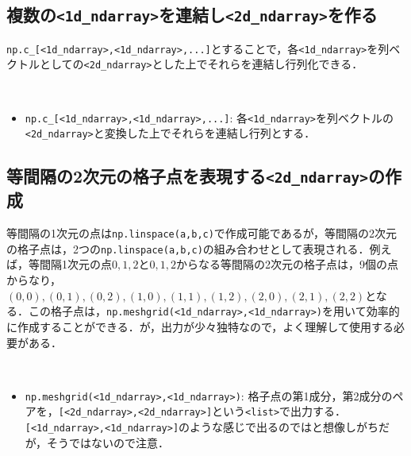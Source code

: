 \subsection{複数の\texttt{<1d\_ndarray>}を連結し\texttt{<2d\_ndarray>}を作る}

\texttt{np.c\_[<1d\_ndarray>,<1d\_ndarray>,...]}とすることで，各\texttt{<1d\_ndarray>}を列ベクトルとしての\texttt{<2d\_ndarray>}とした上でそれらを連結し行列化できる．

\begin{gram}　
\begin{itemize}
\item \texttt{np.c\_[<1d\_ndarray>,<1d\_ndarray>,...]}: 各\texttt{<1d\_ndarray>}を列ベクトルの\texttt{<2d\_ndarray>}と変換した上でそれらを連結し行列とする．
\end{itemize}
\end{gram}

\begin{cod}[\texttt{num9.py}]　
}]{code/num9.py}
\vspace{-10pt}
\begin{lstlisting}
matrix=
[[ 1 -1]
 [ 2 -2]
 [ 3 -3]
 [ 4 -4]],
shape=(4, 2)
\end{lstlisting}
\end{cod}
\vspace{-10pt}


\subsection{等間隔の2次元の格子点を表現する\texttt{<2d\_ndarray>}の作成}

等間隔の1次元の点は\texttt{np.linspace(a,b,c)}で作成可能であるが，等間隔の2次元の格子点は，2つの\texttt{np.linspace(a,b,c)}の組み合わせとして表現される．例えば，等間隔1次元の点$0,1,2$と$0,1,2$からなる等間隔の2次元の格子点は，9個の点からなり，$(0,0),(0,1),(0,2),(1,0),(1,1),(1,2),(2,0),(2,1),(2,2)$となる．この格子点は，\texttt{np.meshgrid(<1d\_ndarray>,<1d\_ndarray>)}を用いて効率的に作成することができる．が，出力が少々独特なので，よく理解して使用する必要がある．

\begin{gram}　
\begin{itemize}
\item \texttt{np.meshgrid(<1d\_ndarray>,<1d\_ndarray>)}: 格子点の第1成分，第2成分のペアを，\texttt{[<2d\_ndarray>,<2d\_ndarray>]}という\texttt{<list>}で出力する．\texttt{[<1d\_ndarray>,<1d\_ndarray>]}のような感じで出るのではと想像しがちだが，そうではないので注意．
\end{itemize}
\end{gram}

